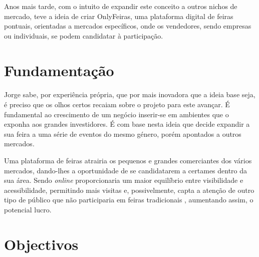 \documentclass[a4paper,12pt]{scrreprt}
\begin{document}
    Anos mais tarde, com o intuito de expandir este conceito a outros nichos de mercado, teve a ideia de criar OnlyFeiras, uma plataforma digital de feiras pontuais, orientadas a mercados específicos, onde os vendedores, sendo empresas ou individuais, se podem candidatar à participação.
    
    \section{Fundamentação}
    \paragraph{}
    
    Jorge sabe, por experiência própria, que por mais inovadora que a ideia base seja, é preciso que os olhos certos recaiam sobre o projeto para este avançar. É fundamental ao crescimento de um negócio inserir-se em ambientes que o exponha aos grandes investidores. É com base nesta ideia que decide expandir a sua feira a uma série de eventos do mesmo género, porém apontados a outros mercados.
    
    Uma plataforma de feiras atrairia os pequenos e grandes comerciantes dos vários mercados, dando-lhes a oportunidade de se candidatarem a certames dentro da sua área. Sendo \textit{online} proporcionaria um maior equilíbrio entre visibilidade e acessibilidade, permitindo mais visitas e, possivelmente, capta a atenção de outro tipo de público que não participaria em feiras tradicionais , aumentando assim, o potencial lucro.

    \section{Objectivos}
\end{document}
